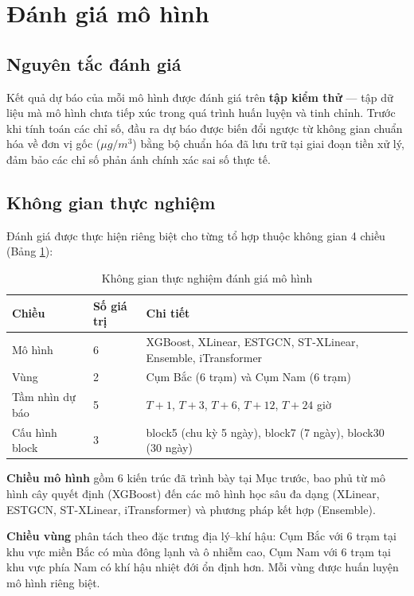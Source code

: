 \section{Đánh giá mô hình}

\subsection{Nguyên tắc đánh giá}

Kết quả dự báo của mỗi mô hình được đánh giá trên \textbf{tập kiểm thử} --- tập dữ liệu mà mô hình chưa tiếp xúc trong quá trình huấn luyện và tinh chỉnh. Trước khi tính toán các chỉ số, đầu ra dự báo được biến đổi ngược từ không gian chuẩn hóa về đơn vị gốc ($\mu g/m^3$) bằng bộ chuẩn hóa đã lưu trữ tại giai đoạn tiền xử lý, đảm bảo các chỉ số phản ánh chính xác sai số thực tế.

\subsection{Không gian thực nghiệm}

Đánh giá được thực hiện riêng biệt cho từng tổ hợp thuộc không gian 4 chiều (Bảng \ref{tab:khong_gian_thuc_nghiem}):

\begin{table}[H]
    \centering
    \caption{Không gian thực nghiệm đánh giá mô hình}
    \label{tab:khong_gian_thuc_nghiem}
    \renewcommand{\arraystretch}{1.3}
    \begin{tabular}{p{3.5cm} p{2cm} p{8.5cm}}
    \toprule
    \textbf{Chiều} & \textbf{Số giá trị} & \textbf{Chi tiết} \\
    \midrule
    Mô hình & 6 & XGBoost, XLinear, ESTGCN, ST-XLinear, Ensemble, iTransformer \\
    Vùng & 2 & Cụm Bắc (6 trạm) và Cụm Nam (6 trạm) \\
    Tầm nhìn dự báo & 5 & $T+1$, $T+3$, $T+6$, $T+12$, $T+24$ giờ \\
    Cấu hình block & 3 & block5 (chu kỳ 5 ngày), block7 (7 ngày), block30 (30 ngày) \\
    \bottomrule
    \end{tabular}
\end{table}

\textbf{Chiều mô hình} gồm 6 kiến trúc đã trình bày tại Mục trước, bao phủ từ mô hình cây quyết định (XGBoost) đến các mô hình học sâu đa dạng (XLinear, ESTGCN, ST-XLinear, iTransformer) và phương pháp kết hợp (Ensemble).

\textbf{Chiều vùng} phân tách theo đặc trưng địa lý--khí hậu: Cụm Bắc với 6 trạm tại khu vực miền Bắc có mùa đông lạnh và ô nhiễm cao, Cụm Nam với 6 trạm tại khu vực phía Nam có khí hậu nhiệt đới ổn định hơn. Mỗi vùng được huấn luyện mô hình riêng biệt.

